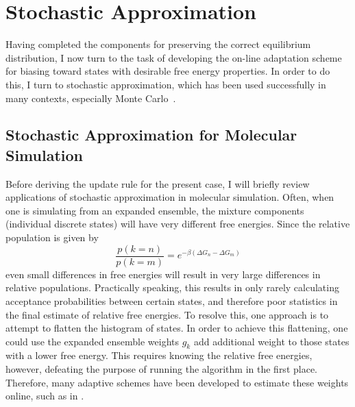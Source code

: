 \chapter{Stochastic Approximation}
%
Having completed the components for preserving the correct equilibrium distribution, I now turn to the task of developing the on-line adaptation scheme for biasing toward states with desirable free energy properties.
%
In order to do this, I turn to stochastic approximation, which has been used successfully in many contexts, especially Monte Carlo~\cite{Robbins1951, Tan2017,Liang2007, Park2006}.
%
\section{Stochastic Approximation for Molecular Simulation}
%
Before deriving the update rule for the present case, I will briefly review applications of stochastic approximation in molecular simulation.
%
Often, when one is simulating from an expanded ensemble, the mixture components (individual discrete states) will have very different free energies.
%
Since the relative population is given by
\begin{equation}
    \frac{p(k=n)}{p(k=m)} = e^{- \beta (\Delta G_n -\Delta G_m)}
\end{equation}
\noindent even small differences in free energies will result in very large differences in relative populations.
%
Practically speaking, this results in only rarely calculating acceptance probabilities between certain states, and therefore poor statistics in the final estimate of relative free energies.
%
To resolve this, one approach is to attempt to flatten the histogram of states.
%
In order to achieve this flattening, one could use the expanded ensemble weights $g_k$ add additional weight to those states with a lower free energy.
%
This requires knowing the relative free energies, however, defeating the purpose of running the algorithm in the first place.
%
Therefore, many adaptive schemes have been developed to estimate these weights online, such as in \cite{Wang2001} \cite{Tan2017} \cite{Liang2007}.
%
